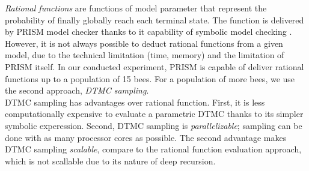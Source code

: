\textit{Rational functions} are functions of model parameter that represent the
probability of finally globally reach each terminal state. The function is
delivered by PRISM model checker thanks to it capability of symbolic model
checking \cite{KNP11}.\\
However, it is not always possible to deduct rational functions from a given
model, due to the technical limitation (time, memory) and the limitation of
PRISM itself. In our conducted experiment, PRISM is capable of deliver rational
functions up to a population of 15 bees. For a population of more bees, we use
the second approach, \textit{DTMC sampling}.\\
DTMC sampling has advantages over rational function. First, it is less
computationally expensive to evaluate a parametric DTMC thanks to its simpler
symbolic experession. Second, DTMC sampling is \textit{parallelizable}; sampling
can be done with as many processor cores as possible. The second advantage makes
DTMC sampling \textit{scalable}, compare to the rational function evaluation
approach, which is not scallable due to its nature of deep recursion.

